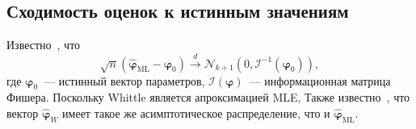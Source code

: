 \documentclass[specialist,
substylefile = spbu_report.rtx,
subf,href,colorlinks=true, 12pt]{disser}
\theoremstyle{definition}
\begin{document}

\subsection{Сходимость оценок к истинным значениям}
Известно~\cite[Theorem 8.1]{Hassler2018}, что
\begin{equation}\label{eq:mle_distribution}
	\sqrt{n}(\widehat{\bm\varphi}_\mathrm{ML} - \bm\varphi_0)\overset{d}{\longrightarrow} \mathcal{N}_{k+1}(0, \mathcal{I}^{-1}(\bm{\varphi}_0)),
\end{equation}
где $\bm\varphi_0$~--- истинный вектор параметров, $\mathcal{I}(\bm\varphi)$~--- информационная матрица Фишера. Поскольку Whittle является апроксимацией MLE, Также известно~\cite[Proposition 8.3]{Hassler2018}, что вектор $\widehat{\bm\varphi}_W$ имеет такое же асимптотическое распределение, что и $\widehat{\bm\varphi}_\mathrm{ML}$.
\end{document}
